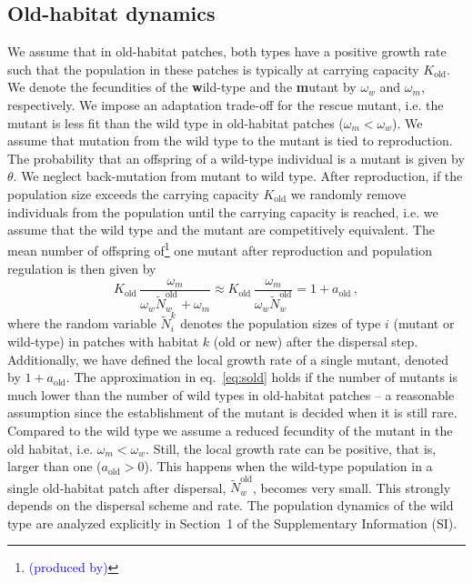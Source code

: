 \documentclass[a4paper,11pt]{article}
\newcommand{\francois}[1]{\textcolor{blue}{(#1)}}
\newcommand{\chg}[1]{\textcolor{change}{#1}}
\begin{document}
\subsection*{Old-habitat dynamics}
We assume that in old-habitat patches, \chg{both types have a positive growth rate such that the population in these patches is typically at carrying capacity $K_{\text{old}}$.} We denote the fecundities of the \textbf{w}ild-type and the \textbf{m}utant by $\omega_w$ and $\omega_m$, respectively. 
We impose an adaptation trade-off for the rescue mutant, i.e. the mutant is less fit than the wild type in old-habitat patches ($\omega_m<\omega_w$).
%
\chg{We assume that mutation from the wild type to the mutant is tied to reproduction. The probability that an offspring of a wild-type individual is a mutant is given by $\theta$. We neglect back-mutation from mutant to wild type.} 
\chg{After reproduction, if the population size exceeds the carrying capacity $K_{\text{old}}$ we randomly remove individuals from the population until the carrying capacity is reached\linelabel{AE-3}, i.e. we assume that the wild type and the mutant are competitively equivalent. The mean number of offspring of\footnote{\francois{produced by}} one mutant after reproduction and population regulation is then given by   
\begin{equation}\label{eq:sold}
     K_{\text{old}}\, \frac{\omega_m}{\omega_w \widetilde{N}^{\text{old}}_w + \omega_m}\approx K_{\text{old}}\, \frac{\omega_m}{\omega_w \widetilde{N}^{\text{old}}_w} =1 + a_{\text{old}} \, ,
\end{equation}
where the random variable $\widetilde{N}_{i}^{k}$ denotes the population sizes of type $i$ (mutant or wild-type) in patches with habitat $k$ (old or new) after the dispersal step. Additionally, we have defined the local growth rate of a single mutant, denoted by $1+a_{\text{old}}$. \linelabel{R1-11}The approximation in eq.~\eqref{eq:sold} holds if the number of mutants is much lower than the number of wild types in old-habitat patches -- a reasonable assumption since the establishment of the mutant is decided when it is still rare.}
\chg{Compared to the wild type we assume a reduced fecundity of the mutant in the old habitat, i.e. $\omega_m<\omega_w$. Still, the local growth rate can be positive, that is, larger than one ($a_{\text{old}}>0$).} This happens when the \chg{wild-type population in a single old-habitat patch after dispersal,} $\widetilde{N}^{\text{old}}_w$, becomes very small. This strongly depends on the dispersal scheme and rate. \chg{The population dynamics of the wild type are analyzed explicitly in Section~1 of the Supplementary Information (SI).}
\end{document}
